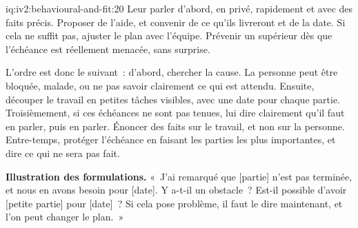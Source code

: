 \begin{solution}{iq:iv2:behavioural-and-fit:20}
Leur parler d'abord, en privé, rapidement et avec des faits précis. Proposer de l'aide, et convenir de ce qu'ils livreront et de la date. Si cela ne suffit pas, ajuster le plan avec l'équipe. Prévenir un supérieur dès que l'échéance est réellement menacée, sans surprise.

L'ordre est donc le suivant~: d'abord, chercher la cause. La personne peut être bloquée, malade, ou ne pas savoir clairement ce qui est attendu. Ensuite, découper le travail en petites tâches visibles, avec une date pour chaque partie. Troisièmement, si ces échéances ne sont pas tenues, lui dire clairement qu'il faut en parler, puis en parler. Énoncer des faits sur le travail, et non sur la personne. Entre-temps, protéger l'échéance en faisant les parties les plus importantes, et dire ce qui ne sera pas fait.

\textbf{Illustration des formulations.} «~J'ai remarqué que [partie] n'est pas terminée, et nous en avons besoin pour [date]. Y a-t-il un obstacle~? Est-il possible d'avoir [petite partie] pour [date]~? Si cela pose problème, il faut le dire maintenant, et l'on peut changer le plan.~»

\end{solution}

